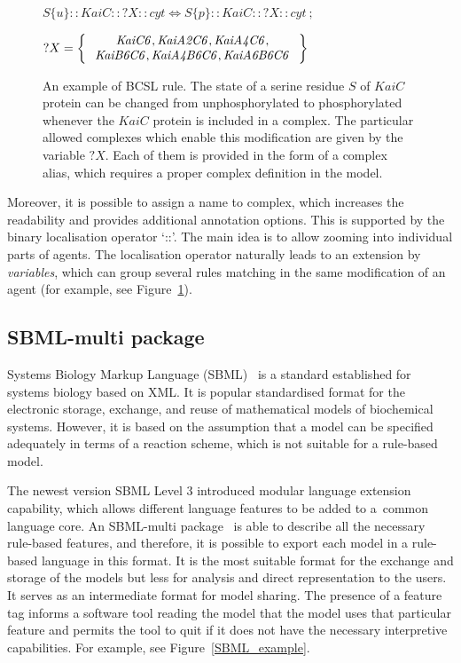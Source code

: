 \documentclass[11pt,a4paper]{report}
\begin{document}
\begin{figure}[!h]
	\begin{center}
		$ S\{u\}{::}KaiC{::}?X{::}cyt \Leftrightarrow S\{p\}{::}KaiC{::}?X{::}cyt ~;~$\vspace*{0.3cm}
		
		$ ?X = \Set{
			\begin{array}{c}
			\mathit{KaiC6}, \mathit{KaiA2C6}, \mathit{KaiA4C6},\\
			\mathit{KaiB6C6}, \mathit{KaiA4B6C6}, \mathit{KaiA6B6C6}
			\end{array}
		}$
	\end{center}
	\caption{An example of BCSL rule. The state of a serine residue $S$ of $KaiC$ protein can be changed from unphosphorylated to phosphorylated whenever the $KaiC$ protein is included in a complex. The particular allowed complexes which enable this modification are given by the variable $?X$. Each of them is provided in the form of a complex alias, which requires a proper complex definition in the model.}
	\label{BCSL_rule}
\end{figure}

Moreover, it is possible to assign a name to complex, which increases the readability and provides additional annotation options. This is supported by the binary localisation operator `{::}'. The main idea is to allow zooming into individual parts of agents. The localisation operator naturally leads to an extension by \emph{variables}, which can group several rules matching in the same modification of an agent (for example, see Figure~\ref{BCSL_rule}).

\subsection{SBML-multi package}

Systems Biology Markup Language (SBML)~\cite{hucka2003systems} is a standard established for systems biology based on XML. It is popular standardised format for the electronic storage, exchange, and reuse of mathematical models of biochemical systems. However, it is based on the assumption that a model can be specified adequately in terms of a reaction scheme, which is not suitable for a rule-based model.

The newest version SBML Level 3 introduced modular language extension capability, which allows different language features to be added to a~common language core. An SBML-multi package~\cite{SBMLmulti} is able to describe all the necessary rule-based features, and therefore, it is possible to export each model in a rule-based language in this format. It is the most suitable format for the exchange and storage of the models but less for analysis and direct representation to the users. It serves as an intermediate format for model sharing. The presence of a feature tag informs a software tool reading the model that the model uses that particular feature and permits the tool to quit if it does not have the necessary interpretive capabilities. For example, see Figure~\ref{SBML_example}.
\end{document}
